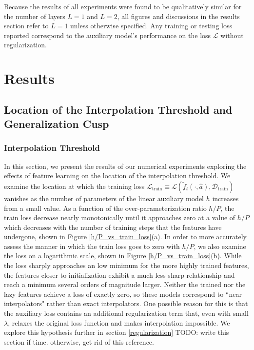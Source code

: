 \documentclass[11pt]{article}
\begin{document}
Because the results of all experiments were found to be qualitatively similar for the number of layers $L=1$ and $L=2$, all figures and discussions in the results section refer to $L=1$ unless otherwise specified. Any training or testing loss reported correspond to the auxiliary model's performance on the loss $\mathcal L$ without regularization.\\

\section{Results}
\label{Results}

\subsection{Location of the Interpolation Threshold and Generalization Cusp}

\subsubsection{Interpolation Threshold}
In this section, we present the results of our numerical experiments exploring the effects of feature learning on the location of the interpolation threshold. We examine the location at which the training loss $\mathcal L_\text{train} \equiv \mathcal L (\tilde f_t(\cdot, \hat 
a), \mathcal D_\text{train})$ vanishes as the number of parameters of the linear auxiliary model $h$ increases from a small value. As a function of the over-parameterization ratio $h/P$, the train loss decrease nearly monotonically until it approaches zero at a value of $h/P$ which decreases with the number of training steps that the features have undergone, shown in Figure \ref{h/P_vs_train_loss}(a). In order to more accurately assess the manner in which the train loss goes to zero with $h/P$, we also examine the loss on a logarithmic scale, shown in Figure \ref{h/P_vs_train_loss}(b). While the loss sharply approaches an low minimum for the more highly trained features, the features closer to initialization exhibit a much less sharp relationship and reach a minimum several orders of magnitude larger. Neither the trained nor the lazy features achieve a loss of exactly zero, so these models correspond to ``near interpolators" rather than exact interpolators. One possible reason for this is that the auxiliary loss contains an additional regularization term that, even with small $\lambda$, relaxes the original loss function and makes interpolation impossible. We explore this hypothesis further in section \ref{regularization} TODO: write this section if time. otherwise, get rid of this reference.\\
\end{document}
